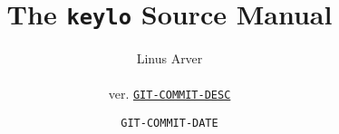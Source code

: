 \documentclass[letterpaper,twoside,12pt]{article}
\begin{document}
\title{The \texttt{keylo} Source Manual}
\author{Linus Arver\\
\\
ver. \href{http://www.github.com/listx/keylo/commit/GIT-COMMIT-HASH}{\texttt{GIT-COMMIT-DESC}}
}
\date{\texttt{GIT-COMMIT-DATE}}
\maketitle
\tableofcontents











%
%
%
%
%
%
\end{document}
